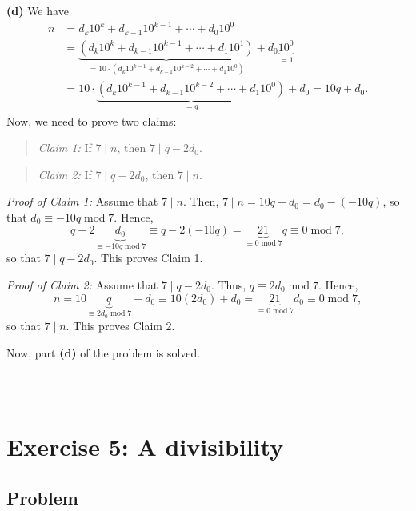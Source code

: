 \documentclass[paper=a4, fontsize=12pt]{scrartcl}%
\theoremstyle{plainsl}
\theoremstyle{definition}
\theoremstyle{remark}
\newenvironment{statement}{\begin{quote}}{\end{quote}}
\begin{document}
\textbf{(d)} We have%
\begin{align*}
n  &  =d_{k}10^{k}+d_{k-1}10^{k-1}+\cdots+d_{0}10^{0}\\
&  =\underbrace{\left(  d_{k}10^{k}+d_{k-1}10^{k-1}+\cdots+d_{1}10^{1}\right)
}_{=10\cdot\left(  d_{k}10^{k-1}+d_{k-1}10^{k-2}+\cdots+d_{1}10^{0}\right)
}+d_{0}\underbrace{10^{0}}_{=1}\\
&  =10\cdot\underbrace{\left(  d_{k}10^{k-1}+d_{k-1}10^{k-2}+\cdots
+d_{1}10^{0}\right)  }_{=q}+d_{0}=10q+d_{0}.
\end{align*}
Now, we need to prove two claims:

\begin{statement}
\textit{Claim 1:} If $7\mid n$, then $7\mid q-2d_{0}$.
\end{statement}

\begin{statement}
\textit{Claim 2:} If $7\mid q-2d_{0}$, then $7\mid n$.
\end{statement}

\textit{Proof of Claim 1:} Assume that $7\mid n$. Then, $7\mid n=10q+d_{0}%
=d_{0}-\left(  -10q\right)  $, so that $d_{0}\equiv-10q\operatorname{mod}7$.
Hence,%
\[
q-2\underbrace{d_{0}}_{\equiv-10q\operatorname{mod}7}\equiv q-2\left(
-10q\right)  =\underbrace{21}_{\equiv0\operatorname{mod}7}q\equiv
0\operatorname{mod}7,
\]
so that $7\mid q-2d_{0}$. This proves Claim 1.

\textit{Proof of Claim 2:} Assume that $7\mid q-2d_{0}$. Thus, $q\equiv
2d_{0}\operatorname{mod}7$. Hence,%
\[
n=10\underbrace{q}_{\equiv2d_{0}\operatorname{mod}7}+d_{0}\equiv10\left(
2d_{0}\right)  +d_{0}=\underbrace{21}_{\equiv0\operatorname{mod}7}d_{0}%
\equiv0\operatorname{mod}7,
\]
so that $7\mid n$. This proves Claim 2.

Now, part \textbf{(d)} of the problem is solved.

\rule{\linewidth}{0.3pt} \\[0.4cm]

\section{Exercise 5: A divisibility}

\subsection{Problem}
\end{document}
